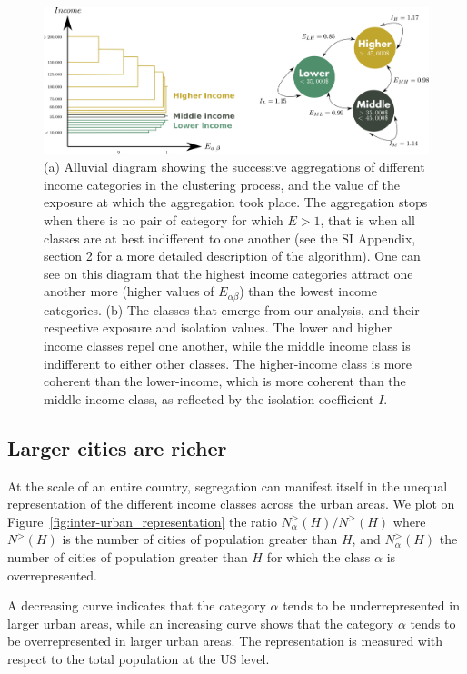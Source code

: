 \begin{figure}
    \includegraphics[width=\textwidth]{./gfx/chapter-segregation/figure1.pdf}
    \caption{(a) Alluvial diagram showing the successive aggregations
      of different income categories in the clustering process, and
      the value of the exposure at which the aggregation took
      place. The aggregation stops when there is no pair of category
      for which $E>1$, that is when all classes are at best
      indifferent to one another (see the SI Appendix, section 2 for a more
      detailed description of the algorithm). One can see on this diagram that
      the highest income categories attract one another more (higher values of
      $E_{\alpha \beta}$) than the lowest income categories. (b) The classes that emerge from our
      analysis, and their respective exposure and isolation values. The lower
      and higher income classes repel one another, while the middle
      income class is indifferent to either other classes.  The
      higher-income class is more coherent than the lower-income,
      which is more coherent than the middle-income class, as
      reflected by the isolation coefficient $I$.}
\label{fig:classes_alluvial}
\end{figure}

\subsection{Larger cities are richer}
\label{sub:inter_urban}

At the scale of an entire country, segregation can manifest itself in the
unequal representation of the different income classes across the urban areas.
We plot on Figure~\ref{fig:inter-urban_representation} the ratio $
N_\alpha^{>}(H)/N^{>}(H)$ where $N^{>}(H)$ is the number of cities of
population greater than $H$, and $N_\alpha^{>}(H)$ the number of cities of
population greater than $H$ for which the class $\alpha$ is overrepresented.


A decreasing curve indicates that the category $\alpha$ tends to be
underrepresented in larger urban areas, while an increasing curve shows that the
category $\alpha$ tends to be overrepresented in larger urban areas.  The
representation is measured with respect to the total population at the US level.

